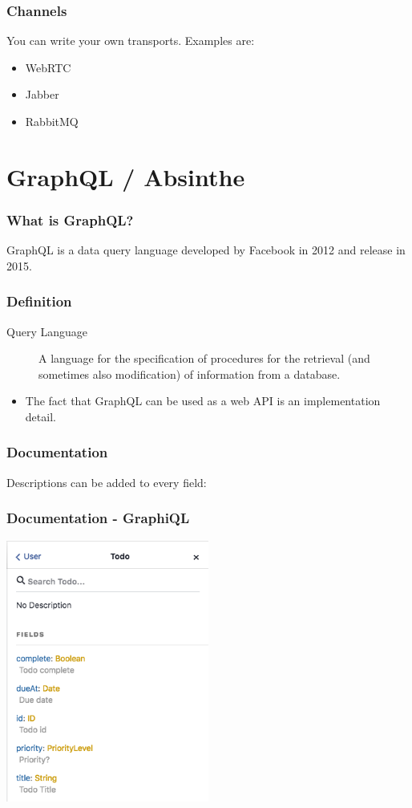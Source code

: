 \documentclass{beamer}
\begin{document}
\begin{frame}
\frametitle{Channels}
You can write your own transports. Examples are:

\begin{itemize}
\item{WebRTC}
\item{Jabber}
\item{RabbitMQ}
\end{itemize}
\end{frame}

\section{GraphQL / Absinthe}

\begin{frame}
\frametitle{What is GraphQL?}
GraphQL is a data \alert{query language} developed by Facebook in 2012 and release in 2015.
\end{frame}

\begin{frame}
  \frametitle{Definition}
  \begin{description}
    \item[{Query Language}] A language for the specification of procedures for the retrieval (and sometimes also modification) of information from a database. \pause
  \end{description}
  \begin{itemize}
    \item{The fact that GraphQL can be used as a web API is an implementation detail.}
  \end{itemize}

\end{frame}

\begin{frame}
  \frametitle{Documentation}
  
  Descriptions can be added to every field:
  \ObjectType
\end{frame}

\begin{frame}
  \frametitle{Documentation - GraphiQL}
  \begin{center}
    \includegraphics[width=0.5\textwidth]{todo_docs}
  \end{center}
\end{frame}
\end{document}
